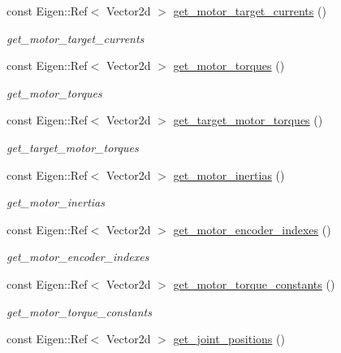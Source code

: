 \begin{DoxyCompactItemize}
const Eigen\+::\+Ref$<$ Vector2d $>$ \hyperlink{classblmc__robots_1_1SingleLeg_aeae6fa29a8a5019d11a7aab9dd443e98}{get\+\_\+motor\+\_\+target\+\_\+currents} ()
\begin{DoxyCompactList}\small\item\em get\+\_\+motor\+\_\+target\+\_\+currents \end{DoxyCompactList}\item 
const Eigen\+::\+Ref$<$ Vector2d $>$ \hyperlink{classblmc__robots_1_1SingleLeg_a11751bde3377207e56ded343e00a99f1}{get\+\_\+motor\+\_\+torques} ()
\begin{DoxyCompactList}\small\item\em get\+\_\+motor\+\_\+torques \end{DoxyCompactList}\item 
const Eigen\+::\+Ref$<$ Vector2d $>$ \hyperlink{classblmc__robots_1_1SingleLeg_a9f3277dbc3bc672e09dbdb51b7818d42}{get\+\_\+target\+\_\+motor\+\_\+torques} ()
\begin{DoxyCompactList}\small\item\em get\+\_\+target\+\_\+motor\+\_\+torques \end{DoxyCompactList}\item 
const Eigen\+::\+Ref$<$ Vector2d $>$ \hyperlink{classblmc__robots_1_1SingleLeg_a2be0f81bd58416d43614e2c6069ca471}{get\+\_\+motor\+\_\+inertias} ()
\begin{DoxyCompactList}\small\item\em get\+\_\+motor\+\_\+inertias \end{DoxyCompactList}\item 
const Eigen\+::\+Ref$<$ Vector2d $>$ \hyperlink{classblmc__robots_1_1SingleLeg_aec4353d090ed7bd503d43b3e17671ded}{get\+\_\+motor\+\_\+encoder\+\_\+indexes} ()
\begin{DoxyCompactList}\small\item\em get\+\_\+motor\+\_\+encoder\+\_\+indexes \end{DoxyCompactList}\item 
const Eigen\+::\+Ref$<$ Vector2d $>$ \hyperlink{classblmc__robots_1_1SingleLeg_a402a4e609e17fb304a113cb5c434b7e3}{get\+\_\+motor\+\_\+torque\+\_\+constants} ()
\begin{DoxyCompactList}\small\item\em get\+\_\+motor\+\_\+torque\+\_\+constants \end{DoxyCompactList}\item 
const Eigen\+::\+Ref$<$ Vector2d $>$ \hyperlink{classblmc__robots_1_1SingleLeg_ad69364827ba1f041bb45aec9ff678a74}{get\+\_\+joint\+\_\+positions} ()

\end{DoxyCompactItemize}
